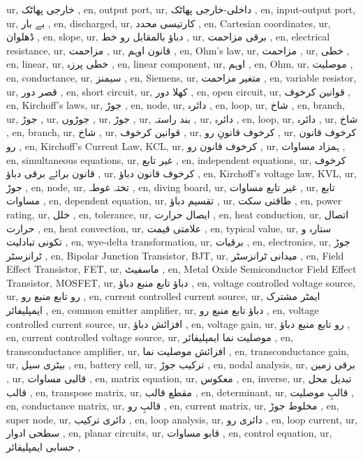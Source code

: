 ur, خارجی پھاٹک ,
en, output port,
ur, داخلی-خارجی پھاٹک ,
en, input-output port,
ur, بے بار ,
en, discharged,
ur, کارتیسی محدد ,
en, Cartesian coordinates,
ur, ڈھلوان ,
en, slope,
ur, دباؤ بالمقابل رو خط ,
ur, برقی مزاحمت ,
en, electrical resistance,
ur, مزاحمت ,
ur, قانون اوہم ,
en, Ohm's law,
ur, مزاحمت ,
ur, خطی ,
en, linear,
ur, خطی پرزہ ,
en, linear component,
ur, اوہم ,
en, Ohm,
ur, موصلیت ,
en, conductance,
ur, سیمنز ,
en, Siemens,
ur, متغیر مزاحمت ,
en, variable resistor,
ur, قصر دور ,
en, short circuit,
ur, کھلا دور ,
en, open circuit,
ur, قوانین کرخوف ,
en, Kirchoff's laws,
ur, جوڑ ,
en, node,
ur, دائرہ ,
en, loop,
ur, شاخ ,
en, branch,
ur, جوڑ ,
ur, جوڑوں ,
ur, جوڑ ,
ur, بند راستہ ,
ur, دائرہ ,
en, loop,
ur, دائرہ ,
ur, شاخ ,
en, branch,
ur, شاخ ,
ur, قوانین کرخوف ,
ur, کرخوف قانونِ رو ,
ur, کرخوف قانون رو ,
en, Kirchoff's Current Law, KCL,
ur, کرخوف قانون رو ,
ur, ہمزاد مساوات ,
en, simultaneous equations,
ur, غیر تابع ,
en, independent equations,
ur, کرخوف قانون برائے برقی دباؤ ,
ur, کرخوف قانون دباؤ ,
en, Kirchoff's voltage law, KVL,
ur, جوڑ ,
en, node,
ur, تختہ غوطہ ,
en, diving board,
ur, غیر تابع مساوات ,
ur, تابع مساوات ,
en, dependent equation,
ur, تقسیم دباؤ ,
ur, طاقتی سکت ,
en, power rating,
ur, خلل ,
en, tolerance,
ur, ایصال حرارت ,
en, heat conduction,
ur, اتصال حرارت ,
en, heat convection,
ur, علامتی قیمت ,
en, typical value,
ur, ستارہ و تکونی تبادلیت ,
en, wye-delta transformation,
ur, برقیات ,
en, electronics,
ur, جوڑ ٹرانزسٹر ,
en, Bipolar Junction Transistor, BJT,
ur, میدانی ٹرانزسٹر ,
en, Field Effect Transistor, FET,
ur, ماسفیٹ ,
en, Metal Oxide Semiconductor Field Effect Transistor, MOSFET,
ur, دباؤ تابع منبع دباؤ ,
en, voltage controlled voltage source,
ur, رو تابع منبع رو ,
en, current controlled current source,
ur, ایمٹر مشترک ایمپلیفائر ,
en, common emitter amplifier,
ur, دباؤ تابع منبع رو ,
en, voltage controlled current source,
ur, افزائش دباؤ ,
en, voltage gain,
ur, رو تابع منبع دباؤ ,
en, current controlled voltage source,
ur, موصلیت نما ایمپلیفائر ,
en, transconductance amplifier,
ur, افزائش موصلیت نما ,
en, transconductance gain,
ur, بیٹری سیل ,
en, battery cell,
ur, ترکیب جوڑ ,
en, nodal analysis,
ur, برقی زمین ,
ur, قالبی مساوات ,
en, matrix equation,
ur, معکوس ,
en, inverse,
ur, تبدیل محل قالب ,
en, transpose matrix,
ur, مقطع قالب ,
en, determinant,
ur, قالبِ موصلیت ,
en, conductance matrix,
ur, قالبِ رو ,
en, current matrix,
ur, مخلوط جوڑ ,
en, super node,
ur, دائری ترکیب ,
en, loop analysis,
ur, دائری رو ,
en, loop current,
ur, سطحی ادوار ,
en, planar circuits,
ur, قابو مساوات ,
en, control equation,
ur, حسابی ایمپلیفائر ,
